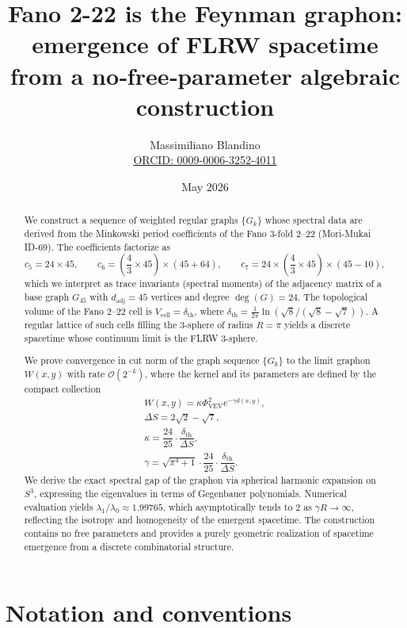 \documentclass[12pt]{article}
\title{Fano 2-22 is the Feynman graphon: emergence of FLRW spacetime from a no‑free‑parameter algebraic construction}
\author{Massimiliano Blandino \\ 
\href{https://orcid.org/0009-0006-3252-4011}{ORCID: 0009-0006-3252-4011}}
\date{May 2026}
\numberwithin{equation}{section}
\newcommand{\VEV}{\Phi_{\mathrm{VEV}}}
\newcommand{\dth}{\delta_{\mathrm{th}}}
\newcommand{\DS}{\Delta S}
\newcommand{\SphereR}{R}
\begin{document}
\maketitle

\begin{abstract}
We construct a sequence of weighted regular graphs \(\{G_k\}\) whose spectral data are derived from the Minkowski period coefficients of the Fano 3-fold 2--22 (Mori-Mukai ID-69). The coefficients factorize as
\[
c_5 = 24 \times 45,\qquad
c_6 = \left(\frac{4}{3} \times 45\right) \times (45 + 64),\qquad
c_7 = 24 \times \left(\frac{4}{3} \times 45\right) \times (45 - 10),
\]
which we interpret as trace invariants (spectral moments) of the adjacency matrix of a base graph \(G_{45}\) with \(d_{\text{adj}} = 45\) vertices and degree \(\deg(G) = 24\). The topological volume of the Fano 2--22 cell is \(V_{\text{cell}} = \dth\), where \(\dth = \frac{1}{2\pi}\ln(\sqrt{8}/(\sqrt{8}-\sqrt{7}))\). A regular lattice of such cells filling the 3-sphere of radius \(\SphereR = \pi\) yields a discrete spacetime whose continuum limit is the FLRW 3-sphere.

We prove convergence in cut norm of the graph sequence \(\{G_k\}\) to the limit graphon \(W(x,y)\) with rate \(\mathcal{O}(2^{-k})\), where the kernel and its parameters are defined by the compact collection
\[
\boxed{\begin{array}{c}
W(x,y) = \kappa \VEV^2 e^{-\gamma d(x,y)},\\[4pt]
\DS = 2\sqrt{2} - \sqrt{7},\\[4pt]
\kappa = \dfrac{24}{25} \cdot \dfrac{\dth}{\DS},\\[8pt]
\gamma = \sqrt{\pi^4+1} \cdot \dfrac{24}{25} \cdot \dfrac{\dth}{\DS}.
\end{array}}
\]
We derive the exact spectral gap of the graphon via spherical harmonic expansion on \(S^3\), expressing the eigenvalues in terms of Gegenbauer polynomials. Numerical evaluation yields \(\lambda_1/\lambda_0 \approx 1.99765\), which asymptotically tends to \(2\) as \(\gamma\SphereR \to \infty\), reflecting the isotropy and homogeneity of the emergent spacetime. The construction contains no free parameters and provides a purely geometric realization of spacetime emergence from a discrete combinatorial structure.
\end{abstract}

\tableofcontents

\section*{Notation and conventions}
\end{document}
